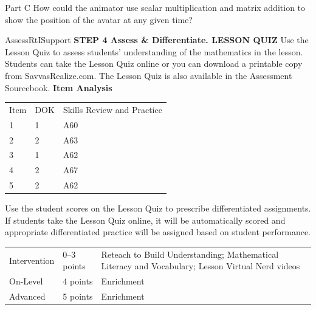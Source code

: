 \documentclass{article}
\newenvironment{practice}[2]{}{}        %
\newenvironment{te-addendum}[2]{}{}     %
\newcommand{\answer}[1]{}               %
\begin{document}
\begin{practice}{36}{3}
Part C How could the animator use scalar multiplication and matrix addition to show the position of the avatar at any given time?
\answer{(\begin{bmatrix}100&150&200\\50&150&50\end{bmatrix}+n\begin{bmatrix}50&50&50\\100&100&100\end{bmatrix}) for (n=1) to 6}
\end{practice}
\begin{te-addendum}{Assess}{RtISupport}
\textbf{STEP 4 Assess \& Differentiate. LESSON QUIZ}
Use the Lesson Quiz to assess students' understanding of the mathematics in the lesson.
Students can take the Lesson Quiz online or you can download a printable copy from SavvasRealize.com. The Lesson Quiz is also available in the Assessment Sourcebook.
\textbf{Item Analysis}
\begin{tabular}{lll}
Item & DOK & Skills Review and Practice \\
1 & 1 & A60 \\
2 & 2 & A63 \\
3 & 1 & A62 \\
4 & 2 & A67 \\
5 & 2 & A62 \\
\end{tabular}
Use the student scores on the Lesson Quiz to prescribe differentiated assignments.
If students take the Lesson Quiz online, it will be automatically scored and appropriate differentiated practice will be assigned based on student performance.
\begin{tabular}{lll}
Intervention & 0--3 points & Reteach to Build Understanding; Mathematical Literacy and Vocabulary; Lesson Virtual Nerd videos \\
On-Level & 4 points & Enrichment \\
Advanced & 5 points & Enrichment \\
\end{tabular}
\end{te-addendum}
\end{document}
